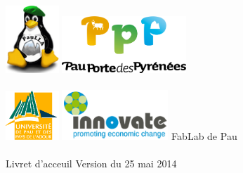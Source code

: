 \begin{center}
\includegraphics[width=0.15\textwidth]{paulla.png} \hfill \includegraphics[width=0.35\textwidth]{PPP.png}
\\~\\
\includegraphics[width=0.15\textwidth]{UPPA.png} \hfill \includegraphics[width=0.30\textwidth]{innovate.png}
\vfill
\Huge FabLab de Pau\\~\\
\huge Livret d'acceuil
\vfill
\footnotesize Version du 25 mai 2014
\end{center}

